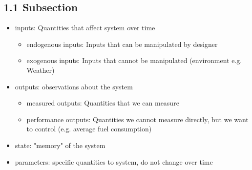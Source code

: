 \subsection{1.1 Subsection}
    \begin{itemize}
        \item inputs: Quantities that affect system over time
        \begin{itemize}
            \item endogenous inputs: Inputs that can be manipulated by designer
            \item exogenous inputs: Inputs that cannot be manipulated (environment e.g. Weather)
        \end{itemize}
        \item outputs: observations about the system
        \begin{itemize}
            \item measured outputs: Quantities that we can measure
            \item performance outputs: Quantities we cannot measure directly, but we want to control (e.g. average fuel consumption)
        \end{itemize}
        \item state: "memory" of the system
        \item parameters: specific quantities to system, do not change over time
\end{itemize}